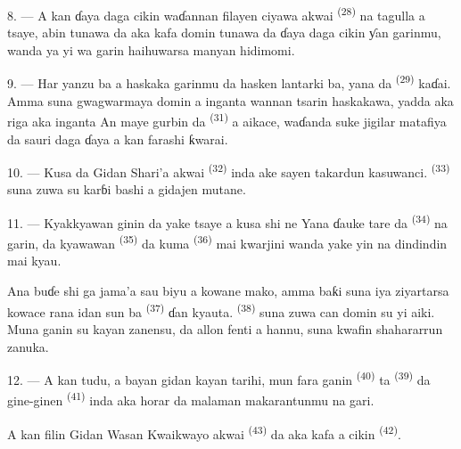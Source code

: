 8. --- A kan ɗaya daga cikin waɗannan filayen ciyawa akwai
 \textsuperscript{(28)} na tagulla a tsaye, abin
tunawa da aka kafa domin tunawa da ɗaya daga cikin ƴan garinmu, wanda
ya yi wa garin haihuwarsa manyan hidimomi.

\VUsaut{4.0mm}
\VUsaut{3.4mm}

9. --- Har yanzu ba a haskaka garinmu da hasken lantarki ba, yana da
 \textsuperscript{(29)} kaɗai. Amma 
suna gwagwarmaya domin a inganta wannan tsarin haskakawa,
 yadda aka riga aka inganta 
An maye gurbin   da
 \textsuperscript{(31)} a aikace, waɗanda suke
jigilar matafiya da sauri daga ɗaya  a
kan farashi  ƙwarai.

10. --- Kusa da Gidan Shari’a akwai  \textsuperscript{(32)}
inda ake sayen takardun kasuwanci. 
\textsuperscript{(33)} suna zuwa su karɓi bashi a gidajen mutane.

\VUsaut{4.0mm}
\VUsaut{3.4mm}

11. --- Kyakkyawan ginin da yake tsaye a kusa shi ne  Yana ɗauke tare da 
\textsuperscript{(34)} na garin, da kyawawan 
\textsuperscript{(35)} da kuma 
\textsuperscript{(36)} mai kwarjini wanda yake yin  na dindindin mai kyau.

Ana buɗe shi ga jama’a sau biyu a kowane mako, amma baƙi suna iya
ziyartarsa kowace rana idan sun ba 
\textsuperscript{(37)} ɗan kyauta. 
\textsuperscript{(38)} suna zuwa can domin su yi aiki. Muna ganin su
 kayan zanensu, da allon fenti a hannu, suna kwafin
shahararrun zanuka.

12. --- A kan tudu, a bayan gidan kayan tarihi, mun fara ganin
 \textsuperscript{(40)} ta 
\textsuperscript{(39)} da gine-ginen 
\textsuperscript{(41)} inda aka horar da malaman makarantunmu na gari.

A kan filin Gidan Wasan Kwaikwayo akwai 
\textsuperscript{(43)} da aka kafa a cikin 
\textsuperscript{(42)}.

